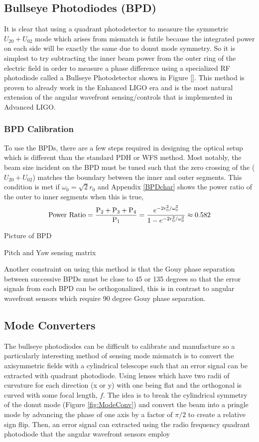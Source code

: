 	\subsection{Bullseye Photodiodes (BPD)}
	It is clear that using a quadrant photodetector to measure the symmetric $U_{20} + U_{02}$ mode which arises from mismatch is futile because the integrated power on each side will be exactly the same due to donut mode symmetry. So it is simplest to try subtracting the inner beam power from the outer ring of the electric field in order to measure a phase difference using a specialized RF photodiode called a Bullseye Photodetector shown in Figure [].  This method is proven to already work in the Enhanced LIGO era \cite{MuellerMM} and is the most natural extension of the angular wavefront sensing/controls that is implemented in Advanced LIGO.
	
	\subsubsection{BPD Calibration}
		To use the BPDs, there are a few steps required in designing the optical setup which is different than the standard PDH or WFS method.  Most notably, the beam size incident on the BPD must be tuned such that the zero crossing of the ($U_{20} + U_{02}$) matches the boundary between the inner and outer segments.  This condition is met if $\omega_{0} = \sqrt{2} r_0$ and Appendix \ref{BPDchar} shows the power ratio of the outer to inner segments when this is true,
		\begin{equation}
		\text{Power Ratio} = \frac{\text{P}_2 + \text{P}_3 + \text{P}_4}{\text{P}_1}  \\
		= \frac{e^{-2r_0^2/ \omega_{0}^2}} {1 - e^{-2r_0^2/ \omega_{0}^2 }} \approx 0.582
		\end{equation}
	
		
		Picture of BPD
		
		Pitch and Yaw sensing matrix

		Another constraint on using this method is that the Gouy phase separation between successive BPDs must be close to 45 or 135 degrees so that the error signals from each BPD can be orthogonalized, this is in contrast to angular wavefront sensors which require 90 degree Gouy phase separation.


\subsection{Mode Converters}
	The bullseye photodiodes can be difficult to calibrate and manufacture so a particularly interesting method of sensing mode mismatch is to convert the axisymmetric fields with a cylindrical telescope such that an error signal can be extracted with quadrant photodiode.  Using lenses which have two radii of curvature for each direction (x or y) with one being flat and the orthogonal is curved with some focal length, $f$.  The idea is to break the cylindrical symmetry of the donut mode (Figure \ref{fig:ModeConv}) and convert the beam into a pringle mode by advancing the phase of one axis by a factor of $\pi/2$ to create a relative sign flip.  Then, an error signal can extracted using the radio frequency quadrant photodiode that the angular wavefront sensors employ

